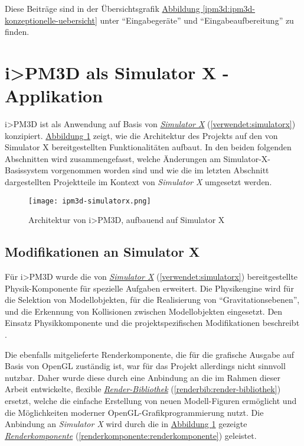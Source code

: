 \documentclass[a4paper,10pt]{sphinxmanual}
\begin{document}
Diese Beiträge sind in der Übersichtsgrafik \hyperref[ipm3d:ipm3d-konzeptionelle-uebersicht]{Abbildung  \ref*{ipm3d:ipm3d-konzeptionelle-uebersicht}} unter "`Eingabegeräte"' und "`Eingabeaufbereitung"' zu finden.


\section{i\textgreater{}PM3D als Simulator X - Applikation}
\label{ipm3d:i-pm3d-als-simulator-x-applikation}
i\textgreater{}PM3D ist als Anwendung auf Basis von {\hyperref[verwendet:simulatorx]{\emph{Simulator X}}} (\autoref*{verwendet:simulatorx}) konzipiert.
\hyperref[ipm3d:ipm3d-simulatorx]{Abbildung  \ref*{ipm3d:ipm3d-simulatorx}} zeigt, wie die Architektur des Projekts auf den von Simulator X bereitgestellten Funktionalitäten aufbaut.
In den beiden folgenden Abschnitten wird zusammengefasst, welche Änderungen am Simulator-X-Basissystem vorgenommen worden sind und wie die im letzten Abschnitt dargestellten Projektteile im Kontext von \emph{Simulator X} umgesetzt werden.
\begin{figure}[htbp]
\centering
\capstart

\texttt{[image: ipm3d-simulatorx.png]}
\caption{Architektur von i\textgreater{}PM3D, aufbauend auf Simulator X}\label{ipm3d:ipm3d-simulatorx}\end{figure}


\subsection{Modifikationen an Simulator X}
\label{ipm3d:mod-simx}\label{ipm3d:modifikationen-an-simulator-x}
Für i\textgreater{}PM3D wurde die von {\hyperref[verwendet:simulatorx]{\emph{Simulator X}}} (\autoref*{verwendet:simulatorx}) bereitgestellte Physik-Komponente für spezielle Aufgaben erweitert. Die Physikengine wird für die Selektion von Modellobjekten, für die Realisierung von "`Gravitationsebenen"', und die Erkennung von Kollisionen zwischen Modellobjekten eingesetzt. Den Einsatz Physikkomponente und die projektspezifischen Modifikationen beschreibt \cite{buchi}.

Die ebenfalls mitgelieferte Renderkomponente, die für die grafische Ausgabe auf Basis von OpenGL zuständig ist, war für das Projekt allerdings nicht sinnvoll nutzbar.
Daher wurde diese durch eine Anbindung an die im Rahmen dieser Arbeit entwickelte, flexible {\hyperref[renderbib:render-bibliothek]{\emph{Render-Bibliothek}}} (\autoref*{renderbib:render-bibliothek}) ersetzt, welche die einfache Erstellung von neuen Modell-Figuren ermöglicht und die Möglichkeiten moderner OpenGL-Grafikprogrammierung nutzt.
Die Anbindung an \emph{Simulator X} wird durch die in \hyperref[ipm3d:ipm3d-simulatorx]{Abbildung  \ref*{ipm3d:ipm3d-simulatorx}} gezeigte {\hyperref[renderkomponente:renderkomponente]{\emph{Renderkomponente}}} (\autoref*{renderkomponente:renderkomponente}) geleistet.
\end{document}
